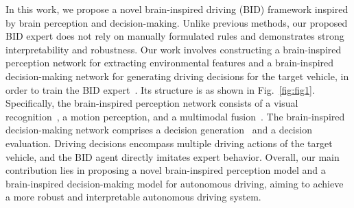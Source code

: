In this work, we propose a novel brain-inspired driving (BID) framework inspired by brain perception and decision-making. 
Unlike previous methods, our proposed BID expert does not rely on manually formulated rules and demonstrates strong interpretability and robustness.
Our work involves constructing a brain-inspired perception network for extracting environmental features and a brain-inspired decision-making network for generating driving decisions for the target vehicle, in order to train the BID expert~\cite{kahn2021land}. 
Its structure is as shown in Fig.~\ref{fig:fig1}. 
Specifically, the brain-inspired perception network consists of a visual recognition~\cite{al2018brain}, a motion perception, and a multimodal fusion~\cite{yu2023brain}. 
The brain-inspired decision-making network comprises a decision generation~\cite{schirner2023learning} and a decision evaluation. 
Driving decisions encompass multiple driving actions of the target vehicle, and the BID agent directly imitates expert behavior. 
Overall, our main contribution lies in proposing a novel brain-inspired perception model and a brain-inspired decision-making model for autonomous driving, aiming to achieve a more robust and interpretable autonomous driving system.





